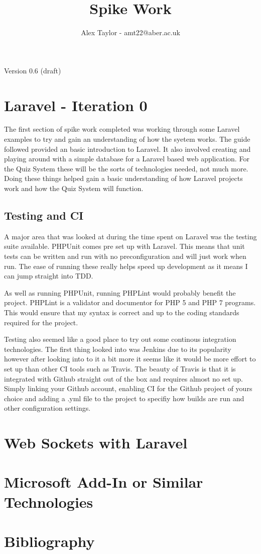 \documentclass{article}
\title{Spike Work}
\author{Alex Taylor - amt22@aber.ac.uk}
\begin{document}
\maketitle
\begin{center}
	Version 0.6 (draft)
\end{center}
\tableofcontents
\thispagestyle{empty}
\newpage

\section{Laravel - Iteration 0}
The first section of spike work completed was working through some Laravel examples to try and gain an understanding of how the syetem works. The guide\cite{Laravel5Guide} followed provided an basic introduction to Laravel. It also involved creating and playing around with a simple database for a Laravel based web application. For the Quiz System these will be the sorts of technologies needed, not much more. Doing these things helped gain a basic understanding of how Laravel projects work and how the Quiz System will function.
\subsection{Testing and CI}
A major area that was looked at during the time spent on Laravel was the testing suite available. PHPUnit comes pre set up with Laravel. This means that unit tests can be written and run with no preconfiguration and will just work when run. The ease of running these really helps speed up development as it means I can jump straight into TDD.

As well as running PHPUnit, running PHPLint would probably benefit the project. PHPLint is a validator and documentor for PHP 5 and PHP 7 programs\cite{PHPLint}. This would ensure that my syntax is correct and up to the coding standards required for the project.

Testing also seemed like a good place to try out some continous integration technologies. The first thing looked into was Jenkins due to its popularity however after looking into to it a bit more it seems like it would be more effort to set up than other CI tools such as Travis. The beauty of Travis is that it is integrated with Github straight out of the box and requires almost no set up. Simply linking your Github account, enabling CI for the Github project of yours choice and adding a .yml file to the project to specifiy how builds are run and other configuration settings.
\newpage

\section{Web Sockets with Laravel}
\newpage

\section{Microsoft Add-In or Similar Technologies}
\newpage

\section{Bibliography}


\end{document}
